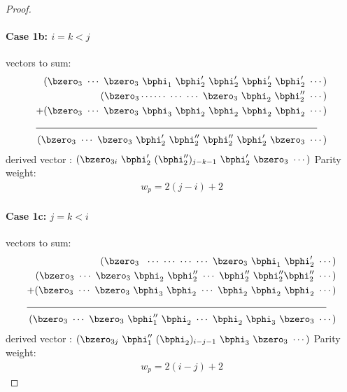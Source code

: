 \documentclass[11pt, oneside, dvipdfmx]{book}
\begin{document}
\begin{proof}
\paragraph{Case 1b: $i=k<j$ \newline}
 vectors to sum:
 \begin{align*}
(\bzero_{3}~\cdots~\bzero_{3}~\bphi_1~\bphi'_2~\bphi'_2~\bphi'_2~\bphi'_2~\cdots)\\
(\bzero_{3}\cdots\cdots~\cdots~\cdots~\bzero_{3}~\bphi_2~\bphi''_2~\cdots)\\
+(\bzero_{3}~\cdots~\bzero_{3}~\bphi_3~\bphi_2~\bphi_2~\bphi_2~\bphi_2~\cdots)\\
\cline{1-2}
(\bzero_{3}~\cdots~\bzero_{3}~\bphi'_2~\bphi''_2~\bphi''_2~\bphi'_2~\bzero_3~\cdots)
\end{align*}
derived vector : $(\bzero_{3i}~\bphi'_2~(\bphi''_2)_{j-k-1}~\bphi'_2~\bzero_3~\cdots)$
\newline
Parity weight: \begin{equation}
\begin{split}
w_p=2(j-i)+2
\end{split}
\end{equation}

\paragraph{Case 1c: $j=k<i$\newline}
 vectors to sum:
\begin{align*}
(\bzero_{3}~~\cdots~\cdots~\cdots~\cdots~\bzero_{3}~\bphi_1~\bphi'_2~\cdots)\\
(\bzero_{3}~\cdots~\bzero_{3}~\bphi_2~\bphi''_2~\cdots~\bphi''_2~\bphi''_2\bphi''_2~\cdots)\\
+(\bzero_{3}~\cdots~\bzero_{3}~\bphi_3~\bphi_2~\cdots~\bphi_2~\bphi_2~\bphi_2~\cdots)\\
\cline{1-2}
(\bzero_{3}~\cdots~\bzero_{3}~\bphi''_1~\bphi_2~\cdots~\bphi_2~\bphi_3~\bzero_3~\cdots)
\end{align*}
derived vector : $(\bzero_{3j}~\bphi''_1~(\bphi_2)_{i-j-1}~\bphi_3~\bzero_3~\cdots)$\newline
Parity weight: \begin{equation}
\begin{split}
w_p=2(i-j)+2
\end{split}
\end{equation}
\newpage

\end{proof}
\end{document}
